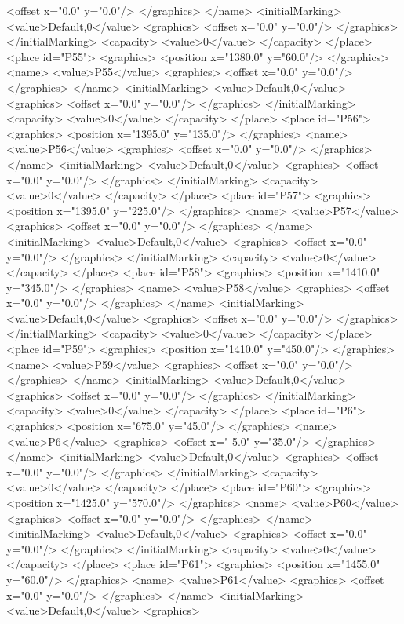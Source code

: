 <offset x="0.0" y="0.0"/>
</graphics>
</name>
<initialMarking>
<value>Default,0</value>
<graphics>
<offset x="0.0" y="0.0"/>
</graphics>
</initialMarking>
<capacity>
<value>0</value>
</capacity>
</place>
<place id="P55">
<graphics>
<position x="1380.0" y="60.0"/>
</graphics>
<name>
<value>P55</value>
<graphics>
<offset x="0.0" y="0.0"/>
</graphics>
</name>
<initialMarking>
<value>Default,0</value>
<graphics>
<offset x="0.0" y="0.0"/>
</graphics>
</initialMarking>
<capacity>
<value>0</value>
</capacity>
</place>
<place id="P56">
<graphics>
<position x="1395.0" y="135.0"/>
</graphics>
<name>
<value>P56</value>
<graphics>
<offset x="0.0" y="0.0"/>
</graphics>
</name>
<initialMarking>
<value>Default,0</value>
<graphics>
<offset x="0.0" y="0.0"/>
</graphics>
</initialMarking>
<capacity>
<value>0</value>
</capacity>
</place>
<place id="P57">
<graphics>
<position x="1395.0" y="225.0"/>
</graphics>
<name>
<value>P57</value>
<graphics>
<offset x="0.0" y="0.0"/>
</graphics>
</name>
<initialMarking>
<value>Default,0</value>
<graphics>
<offset x="0.0" y="0.0"/>
</graphics>
</initialMarking>
<capacity>
<value>0</value>
</capacity>
</place>
<place id="P58">
<graphics>
<position x="1410.0" y="345.0"/>
</graphics>
<name>
<value>P58</value>
<graphics>
<offset x="0.0" y="0.0"/>
</graphics>
</name>
<initialMarking>
<value>Default,0</value>
<graphics>
<offset x="0.0" y="0.0"/>
</graphics>
</initialMarking>
<capacity>
<value>0</value>
</capacity>
</place>
<place id="P59">
<graphics>
<position x="1410.0" y="450.0"/>
</graphics>
<name>
<value>P59</value>
<graphics>
<offset x="0.0" y="0.0"/>
</graphics>
</name>
<initialMarking>
<value>Default,0</value>
<graphics>
<offset x="0.0" y="0.0"/>
</graphics>
</initialMarking>
<capacity>
<value>0</value>
</capacity>
</place>
<place id="P6">
<graphics>
<position x="675.0" y="45.0"/>
</graphics>
<name>
<value>P6</value>
<graphics>
<offset x="-5.0" y="35.0"/>
</graphics>
</name>
<initialMarking>
<value>Default,0</value>
<graphics>
<offset x="0.0" y="0.0"/>
</graphics>
</initialMarking>
<capacity>
<value>0</value>
</capacity>
</place>
<place id="P60">
<graphics>
<position x="1425.0" y="570.0"/>
</graphics>
<name>
<value>P60</value>
<graphics>
<offset x="0.0" y="0.0"/>
</graphics>
</name>
<initialMarking>
<value>Default,0</value>
<graphics>
<offset x="0.0" y="0.0"/>
</graphics>
</initialMarking>
<capacity>
<value>0</value>
</capacity>
</place>
<place id="P61">
<graphics>
<position x="1455.0" y="60.0"/>
</graphics>
<name>
<value>P61</value>
<graphics>
<offset x="0.0" y="0.0"/>
</graphics>
</name>
<initialMarking>
<value>Default,0</value>
<graphics>
